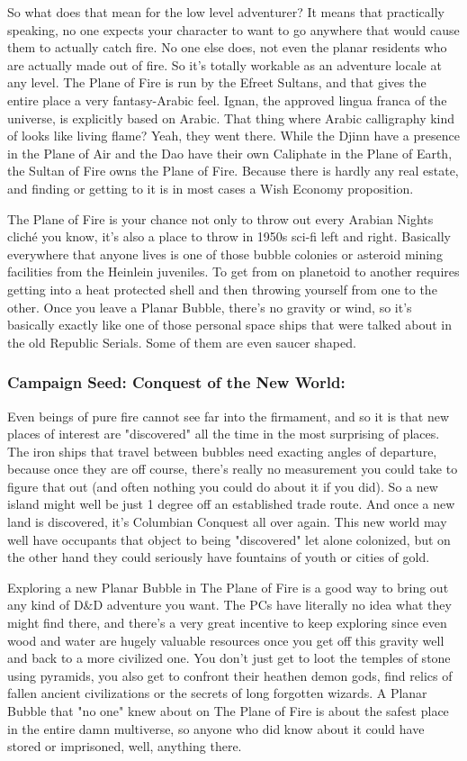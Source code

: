 So what does that mean for the low level adventurer? It means that practically speaking, no one expects your character to want to go anywhere that would cause them to actually catch fire. No one else does, not even the planar residents who are actually made out of fire. So it's totally workable as an adventure locale at any level. The Plane of Fire is run by the Efreet Sultans, and that gives the entire place a very fantasy-Arabic feel. Ignan, the approved lingua franca of the universe, is explicitly based on Arabic. That thing where Arabic calligraphy kind of looks like living flame? Yeah, they went there. While the Djinn have a presence in the Plane of Air and the Dao have their own Caliphate in the Plane of Earth, the Sultan of Fire owns the Plane of Fire. Because there is hardly any real estate, and finding or getting to it is in most cases a Wish Economy proposition.

The Plane of Fire is your chance not only to throw out every Arabian Nights cliché you know, it's also a place to throw in 1950s sci-fi left and right. Basically everywhere that anyone lives is one of those bubble colonies or asteroid mining facilities from the Heinlein juveniles. To get from on planetoid to another requires getting into a heat protected shell and then throwing yourself from one to the other. Once you leave a Planar Bubble, there's no gravity or wind, so it's basically exactly like one of those personal space ships that were talked about in the old Republic Serials. Some of them are even saucer shaped.

\subsubsection{Campaign Seed: Conquest of the New World:} Even beings of pure fire cannot see far into the firmament, and so it is that new places of interest are "discovered" all the time in the most surprising of places. The iron ships that travel between bubbles need exacting angles of departure, because once they are off course, there's really no measurement you could take to figure that out (and often nothing you could do about it if you did). So a new island might well be just 1 degree off an established trade route. And once a new land is discovered, it's Columbian Conquest all over again. This new world may well have occupants that object to being "discovered" let alone colonized, but on the other hand they could seriously have fountains of youth or cities of gold.

Exploring a new Planar Bubble in The Plane of Fire is a good way to bring out any kind of D\&D adventure you want. The PCs have literally no idea what they might find there, and there's a very great incentive to keep exploring since even wood and water are hugely valuable resources once you get off this gravity well and back to a more civilized one. You don't just get to loot the temples of stone using pyramids, you also get to confront their heathen demon gods, find relics of fallen ancient civilizations or the secrets of long forgotten wizards. A Planar Bubble that "no one" knew about on The Plane of Fire is about the safest place in the entire damn multiverse, so anyone who did know about it could have stored or imprisoned, well, anything there.

